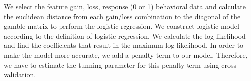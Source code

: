\par \indent We select the feature gain, loss, response (0 or 1) behavioral
data and calculate the euclidean distance from each gain/loss combination to
the diagonal of the gamble matrix to perform the logistic regression. We
construct logistic model according to the definition of logistic regression. We
calculate the log likelihood and find the coefficients that result in the
maximum log likelihood. In order to make the model more accurate, we add a
penalty term to our model. Therefore, we have to estimate the tunning parameter
for this penalty term using cross validation.
